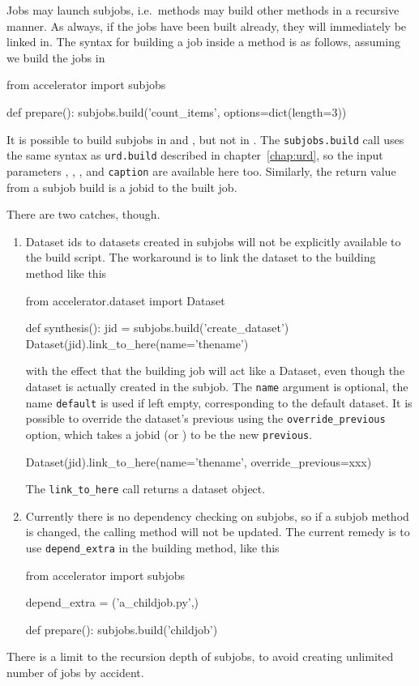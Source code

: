 Jobs may launch subjobs, i.e.\ methods may build other methods in a
recursive manner.  As always, if the jobs have been built already,
they will immediately be linked in.  The syntax for building a job
inside a method is as follows, assuming we build the jobs in \prepare
\begin{python}
from accelerator import subjobs

def prepare():
    subjobs.build('count_items', options=dict(length=3))
\end{python}
It is possible to build subjobs in \prepare and \synthesis, but not in
\analysis.    The \texttt{subjobs.build} call uses the
same syntax as \texttt{urd.build} described in chapter~\ref{chap:urd}, so
the input parameters \options, \datasets, \jobids, and
\texttt{caption} are available here too.  Similarly, the return value
from a subjob build is a jobid to the built job.

There are two catches, though.
\begin{enumerate}
  \item
Dataset ids to datasets created in subjobs will not be explicitly
available to the build script.  The workaround is to link the dataset
to the building method like this 
\begin{python}
from accelerator.dataset import Dataset

def synthesis():
    jid = subjobs.build('create_dataset')
    Dataset(jid).link_to_here(name='thename')
\end{python}
with the effect that the building job will act like a Dataset, even
though the dataset is actually created in the subjob.  The
\texttt{name} argument is optional, the name \texttt{default} is used
if left empty, corresponding to the default dataset.  It is possible
to override the dataset's previous using
the \texttt{override\_previous} option, which takes a jobid
(or \pyNone) to be the new \texttt{previous}.
\begin{python}
Dataset(jid).link_to_here(name='thename', override_previous=xxx)
\end{python}
The \texttt{link\_to\_here} call returns a dataset object.

\item
Currently there is no dependency checking on subjobs, so if a subjob
method is changed, the calling method will not be updated.  The
current remedy is to use \texttt{depend\_extra} in the building
method, like this
\begin{python}
from accelerator import subjobs

depend_extra = ('a_childjob.py',)

def prepare():
    subjobs.build('childjob')
\end{python}
\end{enumerate}
There is a limit to the recursion depth of subjobs, to avoid creating
unlimited number of jobs by accident.




